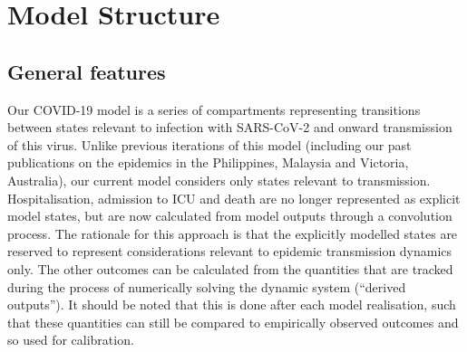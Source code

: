 \section{Model Structure}

\subsection{General features}

Our COVID-19 model is a series of compartments representing transitions between states relevant to infection with SARS-CoV-2 and onward transmission of this virus.
Unlike previous iterations of this model (including our past publications on the epidemics in the Philippines, Malaysia and Victoria, Australia), our current model considers only states relevant to transmission.
Hospitalisation, admission to ICU and death are no longer represented as explicit model states, but are now calculated from model outputs through a convolution process.
The rationale for this approach is that the explicitly modelled states are reserved to represent considerations relevant to epidemic transmission dynamics only.
The other outcomes can be calculated from the quantities that are tracked during the process of numerically solving the dynamic system (``derived outputs'').
It should be noted that this is done after each model realisation, such that these quantities can still be compared to empirically observed outcomes and so used for calibration.

